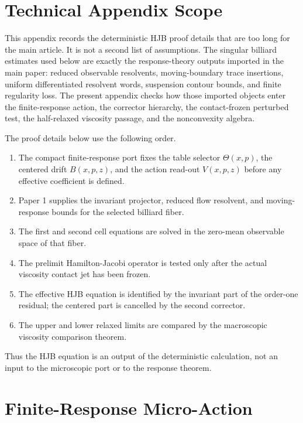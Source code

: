 \section{Technical Appendix Scope}

This appendix records the deterministic HJB proof details that are too long
for the main article.  It is not a second list of assumptions.  The singular
billiard estimates used below are exactly the response-theory outputs imported
in the main paper: reduced observable resolvents, moving-boundary trace
insertions, uniform differentiated resolvent words, suspension contour bounds,
and finite regularity loss.  The present appendix checks how those imported
objects enter the finite-response action, the corrector hierarchy, the
contact-frozen perturbed test, the half-relaxed viscosity passage, and the
nonconvexity algebra.

\begin{definition}
\label{def:supp_hjb_dependency_order}
The proof details below use the following order.
\begin{enumerate}[label=\textup{(\roman*)},wide,labelindent=0pt]
  \item The compact finite-response port fixes the table selector
  \(\Theta(x,p)\), the centered drift \(B(x,p,z)\), and the action read-out
  \(V(x,p,z)\) before any effective coefficient is defined.
  \item Paper 1 supplies the invariant projector, reduced flow resolvent, and
  moving-response bounds for the selected billiard fiber.
  \item The first and second cell equations are solved in the zero-mean
  observable space of that fiber.
  \item The prelimit Hamilton-Jacobi operator is tested only after the actual
  viscosity contact jet has been frozen.
  \item The effective HJB equation is identified by the invariant part of the
  order-one residual; the centered part is cancelled by the second corrector.
  \item The upper and lower relaxed limits are compared by the macroscopic
  viscosity comparison theorem.
\end{enumerate}
Thus the HJB equation is an output of the deterministic calculation, not an
input to the microscopic port or to the response theorem.
\end{definition}

\section{Finite-Response Micro-Action}


